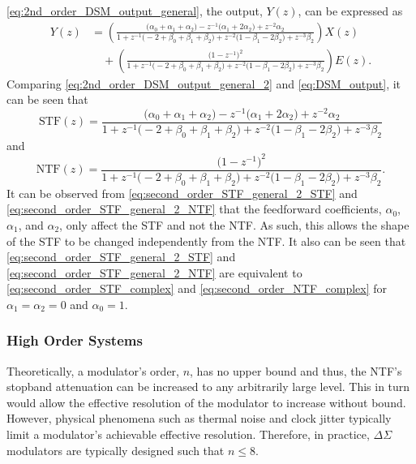 \eqref{eq:2nd_order_DSM_output_general}, the
output, $Y(z)$, can be expressed as 
\begin{equation}\label{eq:2nd_order_DSM_output_general_2}
\begin{split}
 Y(z)& =\left(\frac{
\bigl(\alpha_0+\alpha_1+\alpha_2\bigr)-z^{-1}\bigl(\alpha_1+2\alpha_2\bigr)+z^{-2}\alpha_2
}
{  1+ z^{-1}\bigl(-2+\beta_0+\beta_1+\beta_2\bigr)
   + z^{-2}\bigl(1-\beta_1-2\beta_2\bigr)
   + z^{-3}\beta_2}\right) X(z)\\
&\quad + \left(\frac{\bigl(1-z^{-1}\bigr)^2}
{  1+ z^{-1}\bigl(-2+\beta_0+\beta_1+\beta_2\bigr)
   + z^{-2}\bigl(1-\beta_1-2\beta_2\bigr)
   + z^{-3}\beta_2}\right)E(z)\text{.}
\end{split}
\end{equation}
Comparing \eqref{eq:2nd_order_DSM_output_general_2} and \eqref{eq:DSM_output}, it can
be seen that
\begin{equation}\label{eq:second_order_STF_general_2_STF}
   \text{STF}(z)= \frac{
\bigl(\alpha_0+\alpha_1+\alpha_2\bigr)-z^{-1}\bigl(\alpha_1+2\alpha_2\bigr)+z^{-2}\alpha_2
}
{  1+ z^{-1}\bigl(-2+\beta_0+\beta_1+\beta_2\bigr)
   + z^{-2}\bigl(1-\beta_1-2\beta_2\bigr)
   + z^{-3}\beta_2}
\end{equation}
and
\begin{equation}\label{eq:second_order_STF_general_2_NTF}
   \text{NTF}(z)=
\frac{\bigl(1-z^{-1}\bigr)^2}
{  1+ z^{-1}\bigl(-2+\beta_0+\beta_1+\beta_2\bigr)
   + z^{-2}\bigl(1-\beta_1-2\beta_2\bigr)
   + z^{-3}\beta_2}\text{.}
\end{equation}
It can be observed from \eqref{eq:second_order_STF_general_2_STF} and
\eqref{eq:second_order_STF_general_2_NTF} that the feedforward coefficients, $\alpha_0$,
$\alpha_1$, and $\alpha_2$, only affect the STF and not the NTF. As such, this allows the
shape of the STF to be
changed independently from the NTF. It also can be seen that
\eqref{eq:second_order_STF_general_2_STF} and \eqref{eq:second_order_STF_general_2_NTF}
are equivalent to
\eqref{eq:second_order_STF_complex} and \eqref{eq:second_order_NTF_complex} for
$\alpha_1=\alpha_2=0$ and $\alpha_0=1$.

\subsubsection{High Order Systems}
Theoretically, a \DS modulator's order, $n$, has no upper bound and thus, the NTF's
stopband attenuation can be increased to any arbitrarily large level. This in turn would
allow the effective resolution of the \DS modulator to increase without bound. However,
physical phenomena such as thermal noise and clock jitter typically limit a \DS
modulator's achievable effective resolution. Therefore, in practice, $\Delta\Sigma$
modulators are typically designed such that $n\leq8$. 

